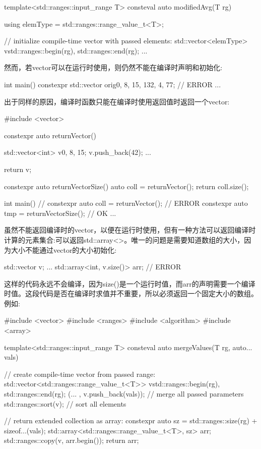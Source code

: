 \begin{cpp}
template<std::ranges::input_range T>
consteval auto modifiedAvg(T rg)
{
	using elemType = std::ranges::range_value_t<T>;

	// initialize compile-time vector with passed elements:
	std::vector<elemType> v{std::ranges::begin(rg),
							std::ranges::end(rg)};
	...
}
\end{cpp}

然而，若vector可以在运行时使用，则仍然不能在编译时声明和初始化:

\begin{cpp}
int main()
{
	constexpr std::vector orig{0, 8, 15, 132, 4, 77}; // ERROR
	...
}
\end{cpp}

出于同样的原因，编译时函数只能在编译时使用返回值时返回一个vector:


\begin{cpp}
#include <vector>

constexpr auto returnVector()
{
	std::vector<int> v{0, 8, 15};
	v.push_back(42);
	...

	return v;
}

constexpr auto returnVectorSize()
{
	auto coll = returnVector();
	return coll.size();
}

int main()
{
	// constexpr auto coll = returnVector(); // ERROR
	constexpr auto tmp = returnVectorSize(); // OK
	...
}
\end{cpp}


虽然不能返回编译时的vector，以便在运行时使用，但有一种方法可以返回编译时计算的元素集合:可以返回std::array<>。唯一的问题是需要知道数组的大小，因为大小不能通过vector的大小初始化:

\begin{cpp}
std::vector v;
...
std::array<int, v.size()> arr; // ERROR
\end{cpp}

这样的代码永远不会编译，因为size()是一个运行时值，而arr的声明需要一个编译时值。这段代码是否在编译时求值并不重要，所以必须返回一个固定大小的数组。例如:


\begin{cpp}
#include <vector>
#include <ranges>
#include <algorithm>
#include <array>

template<std::ranges::input_range T>
consteval auto mergeValues(T rg, auto... vals)
{
	// create compile-time vector from passed range:
	std::vector<std::ranges::range_value_t<T>> v{std::ranges::begin(rg),
												 std::ranges::end(rg)};
	(... , v.push_back(vals)); // merge all passed parameters
	std::ranges::sort(v); // sort all elements

	// return extended collection as array:
	constexpr auto sz = std::ranges::size(rg) + sizeof...(vals);
	std::array<std::ranges::range_value_t<T>, sz> arr{};
	std::ranges::copy(v, arr.begin());
	return arr;
}
\end{cpp}

